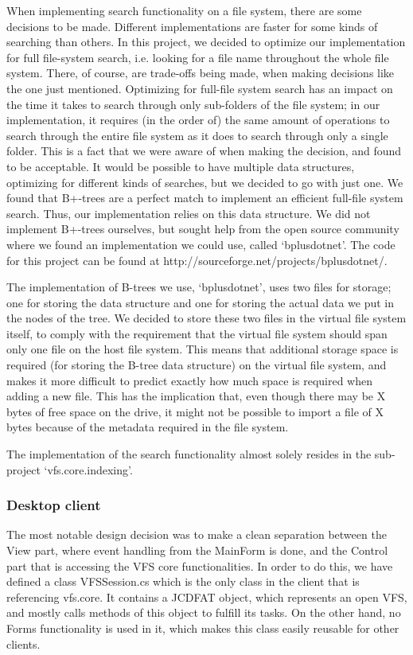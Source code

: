 \documentclass[a4paper,12pt]{article}
\begin{document}
When implementing search functionality on a file system, there are some decisions to be made. Different implementations are faster for some kinds of searching than others. In this project, we decided to optimize our implementation for full file-system search, i.e. looking for a file name throughout the whole file system. There, of course, are trade-offs being made, when making decisions like the one just mentioned. Optimizing for full-file system search has an impact on the time it takes to search through only sub-folders of the file system; in our implementation, it requires (in the order of) the same amount of operations to search through the entire file system as it does to search through only a single folder. This is a fact that we were aware of when making the decision, and found to be acceptable. It would be possible to have multiple data structures, optimizing for different kinds of searches, but we decided to go with just one.
We found that B+-trees are a perfect match to implement an efficient full-file system search. Thus, our implementation relies on this data structure. We did not implement B+-trees ourselves, but sought help from the open source community where we found an implementation we could use, called `bplusdotnet'. The code for this project can be found at http://sourceforge.net/projects/bplusdotnet/.


The implementation of B-trees we use, `bplusdotnet', uses two files for storage; one for storing the data structure and one for storing the actual data we put in the nodes of the tree. We decided to store these two files in the virtual file system itself, to comply with the requirement that the virtual file system should span only one file on the host file system. This means that additional storage space is required (for storing the B-tree data structure) on the virtual file system, and makes it more difficult to predict exactly how much space is required when adding a new file. This has the implication that, even though there may be X bytes of free space on the drive, it might not be possible to import a file of X bytes because of the metadata required in the file system.

The implementation of the search functionality almost solely resides in the sub-project `vfs.core.indexing'.


\subsubsection{Desktop client}
The most notable design decision was to make a clean separation between the View part, where event handling from the MainForm is done, and the Control part that is accessing the VFS core functionalities. In order to do this, we have defined a class VFSSession.cs which is the only class in the client that is referencing vfs.core. It contains a JCDFAT object, which represents an open VFS, and mostly calls methods of this object to fulfill its tasks. On the other hand, no Forms functionality is used in it, which makes this class easily reusable for other clients.
\end{document}
